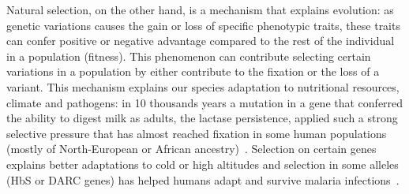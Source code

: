 Natural selection, on the other hand, is a mechanism that explains evolution: as genetic variations causes the gain or loss of specific phenotypic traits, these traits can confer positive or negative advantage compared to the rest of the individual in a population (fitness). This phenomenon can contribute selecting certain variations in a population by either contribute to the fixation or the loss of a variant. This mechanism explains our species adaptation to nutritional resources, climate and pathogens: in 10 thousands years a mutation in a gene that conferred the ability to digest milk as adults, the lactase persistence, applied such a strong selective pressure that has almost reached fixation in some human populations (mostly of North-European or African ancestry)~\cite{lactase}. Selection on certain genes explains better adaptations to cold or high altitudes and selection in some alleles (HbS or DARC genes) has helped humans adapt and survive malaria infections~\cite{genome_diversity_quintana}. 


